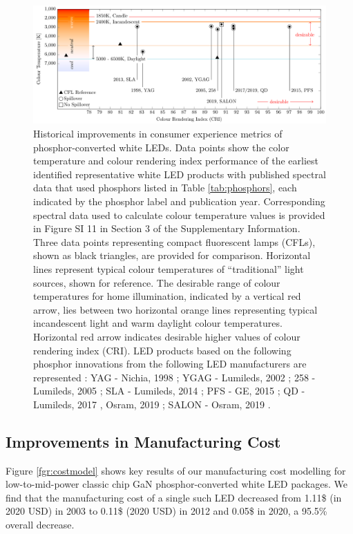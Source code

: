 \documentclass[parskip=full]{article}
\begin{document}
\begin{figure}[h!]
 \centering
 \includegraphics[width=\textwidth]{figures/breakthroughs_consumer-experience.pdf}
 \caption{Historical improvements in consumer experience metrics of phosphor-converted white LEDs. Data points show the color temperature and colour rendering index performance of the earliest identified representative white LED products with published spectral data that used phosphors listed in Table \ref{tab:phosphors}, each indicated by the phosphor label and publication year. Corresponding spectral data used to calculate colour temperature values is provided in Figure SI 11 in Section 3 of the Supplementary Information. Three data points representing compact fluorescent lamps (CFLs)\cite{cie_reference}, shown as black triangles, are provided for comparison. Horizontal lines represent typical colour temperatures of “traditional” light sources, shown for reference. The desirable range of colour temperatures for home illumination, indicated by a vertical red arrow, lies between two horizontal orange lines representing typical incandescent light and warm daylight colour temperatures. Horizontal red arrow indicates desirable higher values of colour rendering index (CRI). LED products based on the following phosphor innovations from the following LED manufacturers are represented : YAG - Nichia, 1998 \cite{bando1998development}; YGAG - Lumileds, 2002 \cite{Mueller2002}; 258 - Lumileds, 2005 \cite{MuellerMach2005}; SLA - Lumileds, 2014 \cite{Pust2014}; PFS - GE, 2015 \cite{Murphy2015}; QD - Lumileds, 2017 \cite{lumileds2016qd}, Osram, 2019 \cite{osram2019qd}; SALON - Osram, 2019 \cite{Hoerder2019}.}
 \label{fgr:consumer_experience}
\end{figure}

\subsection{Improvements in Manufacturing Cost}

Figure \ref{fgr:costmodel} shows key results of our manufacturing cost modelling for low-to-mid-power classic chip GaN phosphor-converted white LED packages. We find that the manufacturing cost of a single such LED decreased from 1.11\$ (in 2020 USD) in 2003 to 0.11\$ (2020 USD) in 2012 and 0.05\$ in 2020, a 95.5\% overall decrease.
\end{document}

